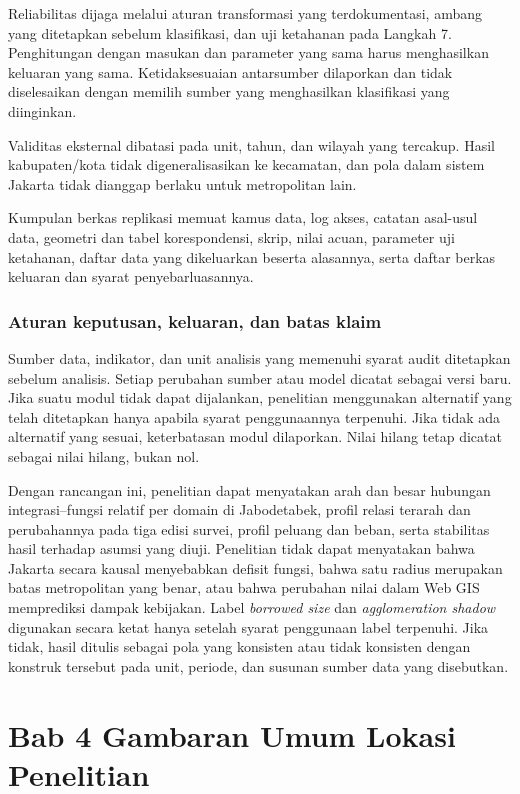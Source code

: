 \documentclass[12pt,a4paper,oneside,openany,indonesian]{report}
\begin{document}
Reliabilitas dijaga melalui aturan transformasi yang terdokumentasi,
ambang yang ditetapkan sebelum klasifikasi, dan uji ketahanan pada
Langkah 7. Penghitungan dengan masukan dan parameter yang sama harus
menghasilkan keluaran yang sama. Ketidaksesuaian antarsumber dilaporkan
dan tidak diselesaikan dengan memilih sumber yang menghasilkan
klasifikasi yang diinginkan.

Validitas eksternal dibatasi pada unit, tahun, dan wilayah yang
tercakup. Hasil kabupaten/kota tidak digeneralisasikan ke kecamatan,
dan pola dalam sistem Jakarta tidak dianggap berlaku untuk metropolitan
lain.

Kumpulan berkas replikasi memuat kamus data, log akses, catatan asal-usul data,
geometri dan tabel korespondensi, skrip, nilai acuan, parameter
uji ketahanan, daftar data yang dikeluarkan beserta alasannya, serta
daftar berkas keluaran dan syarat penyebarluasannya.

\subsection{Aturan keputusan, keluaran, dan batas
klaim}\label{aturan-keputusan-keluaran-dan-batas-klaim}

Sumber data, indikator, dan unit analisis yang memenuhi syarat audit
ditetapkan sebelum analisis. Setiap perubahan sumber atau model dicatat
sebagai versi baru. Jika suatu modul tidak dapat dijalankan, penelitian
menggunakan alternatif yang telah ditetapkan hanya apabila syarat
penggunaannya terpenuhi. Jika tidak ada alternatif yang sesuai,
keterbatasan modul dilaporkan. Nilai hilang tetap dicatat sebagai nilai
hilang, bukan nol.

Dengan rancangan ini, penelitian dapat menyatakan arah dan besar
hubungan integrasi--fungsi relatif per domain di Jabodetabek, profil
relasi terarah dan perubahannya pada tiga edisi survei, profil peluang
dan beban, serta stabilitas hasil terhadap asumsi yang diuji. Penelitian
tidak dapat menyatakan bahwa Jakarta secara kausal menyebabkan defisit
fungsi, bahwa satu radius merupakan batas metropolitan yang benar, atau
bahwa perubahan nilai dalam Web GIS memprediksi dampak kebijakan.
Label \emph{borrowed size} dan \emph{agglomeration shadow} digunakan
secara ketat hanya setelah syarat penggunaan label terpenuhi. Jika tidak, hasil
ditulis sebagai pola yang konsisten atau tidak konsisten dengan konstruk
tersebut pada unit, periode, dan susunan sumber data yang disebutkan.
\clearpage

\chapter{Bab 4 Gambaran Umum Lokasi Penelitian}
\end{document}
